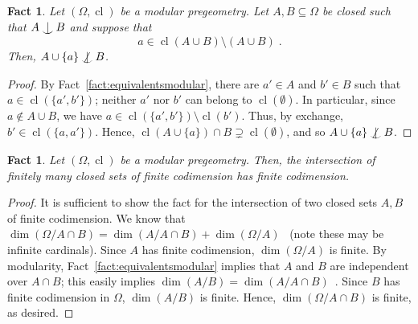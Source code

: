 \documentclass{article}
\newtheorem{fact}[theorem]{Fact}
\theoremstyle{remark}
\theoremstyle{definition}
\DeclareMathOperator{\cl}{cl}
\def\Ind#1#2{#1\setbox0=\hbox{$#1x$}\kern\wd0\hbox to 0pt{\hss$#1\mid$\hss}
	\lower.9\ht0\hbox to 0pt{\hss$#1\smile$\hss}\kern\wd0}
\def\ind{\mathop{\mathpalette\Ind{}}}
\def\Notind#1#2{#1\setbox0=\hbox{$#1x$}\kern\wd0\hbox to 0pt{\mathchardef
		\nn="3236\hss$#1\nn$\kern1.4\wd0\hss}\hbox to
	0pt{\hss$#1\mid$\hss}\lower.9\ht0
	\hbox to 0pt{\hss$#1\smile$\hss}\kern\wd0}
\def\nind{\mathop{\mathpalette\Notind{}}}
\begin{document}
{{\begin{fact}\label{fact:modularity} Let $(\Omega, \cl)$ be a modular pregeometry. Let $A, B\subseteq\Omega$ be closed such that $A\ind B$ and suppose that
\[a\in\cl(A\cup B)\setminus(A\cup B)\;.\]
Then, $A\cup\{a\}\nind B$.
\end{fact}
\begin{proof} By Fact~\ref{fact:equivalentsmodular}, there are $a'\in A$ and $b'\in B$ such that $a\in\cl(\{a',b'\})$; neither $a'$ nor $b'$ can belong to $\cl(\emptyset)$. In particular, since $a\not\in A\cup B$, we have $a\in\cl(\{a',b'\})\setminus \cl(b')$. Thus, by exchange, $b'\in\cl(\{a,a'\})$. %
Hence, $\cl(A\cup \{a\})\cap B\supsetneq \cl(\emptyset)$, and so  $A\cup\{a\}\nind B$.
\end{proof}

\begin{fact}\label{fact:codimension} Let $(\Omega, \cl)$ be a modular pregeometry. Then, the intersection of finitely many closed sets of finite codimension has finite codimension.  
\end{fact}
\begin{proof}It is sufficient to show the fact for the intersection of two closed sets $A,B$ of finite codimension. We know that 
 $\dim(\Omega/A\cap B)=\dim(A/A\cap B)+\dim(\Omega/A)$~\cite[Lemma C.1.8]{tent2012course} (note these may be infinite cardinals). Since $A$ has finite codimension, $\dim(\Omega/A)$ is finite. By modularity,  Fact~\ref{fact:equivalentsmodular} implies that $A$ and $B$ are independent over $A\cap B$; this easily implies   $\dim(A/B)=\dim(A/A\cap B)$~\cite[Lemma C.1.10]{tent2012course}. Since $B$ has finite codimension in $\Omega$, $\dim(A/B)$ is finite. Hence, $\dim(\Omega/A\cap B)$ is finite, as desired.
\end{proof}


}}
\end{document}
